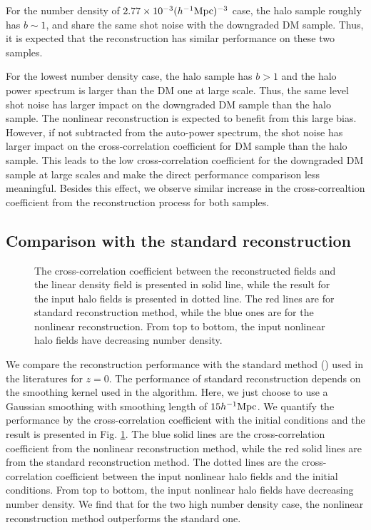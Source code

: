\documentclass[iop]{emulateapj}
\newcommand{\mpch}{h^{-1} {\rm Mpc}}
\begin{document}
{For the number density of $2.77\times 10^{-3} (\mpch)^{-3}$ case, the halo sample roughly has $b\sim 1$, and share the same shot noise with the downgraded DM sample.
Thus, it is expected that the reconstruction has similar performance on these two samples. 

For the lowest number density case, the halo sample has $b>1$ and the halo power spectrum is larger than the DM one at large scale.
Thus, the same level shot noise has larger impact on the downgraded DM sample than the halo sample.
The nonlinear reconstruction is expected to benefit from this large bias.
However, if not subtracted from the auto-power spectrum, the shot noise has larger impact on the cross-correlation coefficient for DM sample than the halo sample.
This leads to the low cross-correlation coefficient for the downgraded DM sample at large scales
and make the direct performance comparison less meaningful.
Besides this effect, we observe similar increase in the cross-correaltion coefficient from the reconstruction process for both samples.


\subsection{Comparison with the standard reconstruction}
\label{sec:compareeisen}

\begin{figure}
\epsfxsize=8.5cm
\caption{The cross-correlation coefficient between the reconstructed fields and the linear density field is presented in solid line, while the result for the input halo fields is presented in dotted line.
The red lines are for standard reconstruction method, while the blue ones are for the nonlinear reconstruction.
From top to bottom, the input nonlinear halo fields have decreasing number density. }
\label{fig:comparestandard}
\end{figure}

We compare the reconstruction performance with the standard method (\cite{Eisenstein07}) used in the literatures for $z=0$.
The performance of standard reconstruction depends on the smoothing kernel used in the algorithm.
Here, we just choose to use a Gaussian smoothing with smoothing length of  $15 \mpch$.
We quantify the performance by the cross-correlation coefficient with the initial conditions and 
the result is presented in Fig. \ref{fig:comparestandard}.
The blue solid lines are the cross-correlation coefficient from the nonlinear reconstruction method,
 while the red solid lines are from the standard reconstruction method.
The dotted lines are the cross-correlation coefficient between the input nonlinear halo fields and the initial conditions.
From top to bottom, the input nonlinear halo fields have decreasing number density. 
We find that for the two high number density case, the nonlinear reconstruction method outperforms the standard one.

}
\end{document}
